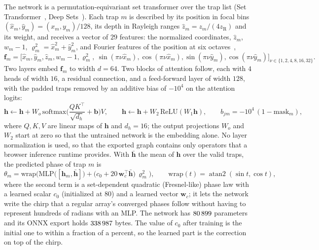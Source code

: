 The network is a permutation-equivariant set transformer over the trap list (Set Transformer~\cite{settransformer}, Deep Sets~\cite{deepsets}). Each trap $m$ is described by its position in focal bins $(\hat x_m,\hat y_m)=(x_m,y_m)/128$, its depth in Rayleigh ranges $\hat z_m=z_m/(4z_{\mathrm R})$ and its weight, and receives a vector of $29$ features: the normalized coordinates, $\hat z_m$, $w_m-1$, $\varrho_m^2=\hat x_m^2+\hat y_m^2$, and Fourier features of the position at six octaves~\cite{fourierfeatures},
\begin{equation}
\mathbf f_m=\big[\hat x_m,\hat y_m,\hat z_m,w_m-1,\varrho_m^2,\ \sin(\pi\nu\hat x_m),\cos(\pi\nu\hat x_m),\sin(\pi\nu\hat y_m),\cos(\pi\nu\hat y_m)\big]_{\nu\in\{1,2,4,8,16,32\}}.
\label{eq:features}
\end{equation}
Two layers embed $\mathbf f_m$ to width $d=64$. Two blocks of attention follow, each with $4$ heads of width $16$, a residual connection, and a feed-forward layer of width $128$, with the padded traps removed by an additive bias of $-10^{4}$ on the attention logits:
\begin{equation}
\mathbf h\leftarrow\mathbf h+W_o\,\mathrm{softmax}\!\Big(\frac{QK^{\top}}{\sqrt{d_h}}+\mathbf b\Big)V,\qquad \mathbf h\leftarrow\mathbf h+W_2\,\mathrm{ReLU}(W_1\mathbf h),\qquad b_{jm}=-10^4\,(1-\mathrm{mask}_m),
\label{eq:attention}
\end{equation}
where $Q,K,V$ are linear maps of $\mathbf h$ and $d_h=16$; the output projections $W_o$ and $W_2$ start at zero so that the untrained network is the embedding alone. No layer normalization is used, so that the exported graph contains only operators that a browser inference runtime provides. With $\bar{\mathbf h}$ the mean of $\mathbf h$ over the valid traps, the predicted phase of trap $m$ is
\begin{equation}
\theta_m=\mathrm{wrap}\Big(\mathrm{MLP}\big([\mathbf h_m,\bar{\mathbf h}]\big)+\big(c_0+20\,\mathbf w_c^{\top}\bar{\mathbf h}\big)\,\varrho_m^2\Big),\qquad \mathrm{wrap}(t)=\operatorname{atan2}(\sin t,\cos t),
\label{eq:output}
\end{equation}
where the second term is a set-dependent quadratic (Fresnel-like) phase law with a learned scalar $c_0$ (initialized at $80$) and a learned vector $\mathbf w_c$; it lets the network write the chirp that a regular array's converged phases follow without having to represent hundreds of radians with an MLP. The network has $80\,899$ parameters and its ONNX export holds $338\,987$ bytes. The value of $c_0$ after training is the initial one to
within a fraction of a percent, so the learned part is the correction on top of the chirp.

